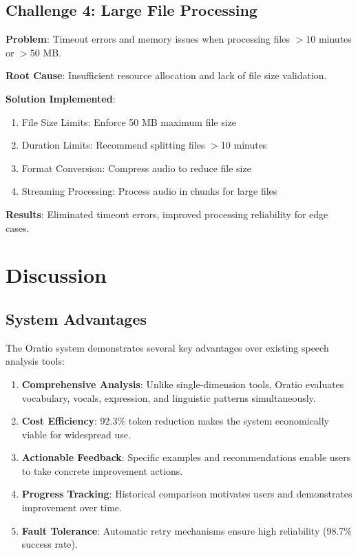 \documentclass[conference]{IEEEtran}
\begin{document}
\subsection{Challenge 4: Large File Processing}

\textbf{Problem}: Timeout errors and memory issues when processing files $>$10 minutes or $>$50 MB.

\textbf{Root Cause}: Insufficient resource allocation and lack of file size validation.

\textbf{Solution Implemented}:
\begin{enumerate}
    \item File Size Limits: Enforce 50 MB maximum file size
    \item Duration Limits: Recommend splitting files $>$10 minutes
    \item Format Conversion: Compress audio to reduce file size
    \item Streaming Processing: Process audio in chunks for large files
\end{enumerate}

\textbf{Results}: Eliminated timeout errors, improved processing reliability for edge cases.

\section{Discussion}

\subsection{System Advantages}

The Oratio system demonstrates several key advantages over existing speech analysis tools:

\begin{enumerate}
    \item \textbf{Comprehensive Analysis}: Unlike single-dimension tools, Oratio evaluates vocabulary, vocals, expression, and linguistic patterns simultaneously.
    \item \textbf{Cost Efficiency}: 92.3\% token reduction makes the system economically viable for widespread use.
    \item \textbf{Actionable Feedback}: Specific examples and recommendations enable users to take concrete improvement actions.
    \item \textbf{Progress Tracking}: Historical comparison motivates users and demonstrates improvement over time.
    \item \textbf{Fault Tolerance}: Automatic retry mechanisms ensure high reliability (98.7\% success rate).
\end{enumerate}
\end{document}
